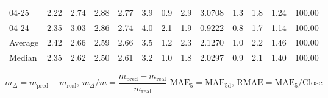 \begin{threeparttable}
{\begin{tabular}{lrrrrrrrrrrrr}
  04-25 &          2.22 &          2.74 &          2.88 &        2.77 &                 3.9 &                 0.9 &        2.9 &       3.0708 &                 1.3 &              1.8 &            1.24 &                 100.00 \\
  04-24 &          2.35 &          3.03 &          2.86 &        2.74 &                 4.0 &                 2.1 &        1.9 &       0.9222 &                 0.8 &              1.7 &            1.14 &                 100.00 \\
Average &          2.42 &          2.66 &          2.59 &        2.66 &                 3.5 &                 1.2 &        2.3 &       2.1270 &                 1.0 &              2.2 &            1.46 &                 100.00 \\
 Median &          2.35 &          2.62 &          2.50 &        2.61 &                 3.2 &                 1.0 &        1.8 &       2.0297 &                 0.9 &              2.1 &            1.40 &                 100.00 \\
\bottomrule
\end{tabular}
}
\begin{tablenotes}\footnotesize
\item $m_\Delta=m_{\text{pred}}-m_{\text{real}}$,
$m_\Delta/m=\dfrac{m_{\text{pred}}-m_{\text{real}}}{m_{\text{real}}}$
$\mathrm{MAE}_5=\mathrm{MAE}_{5\text{d}}$,
$\mathrm{RMAE}=\mathrm{MAE}_5/\text{Close}$
\end{tablenotes}
\end{threeparttable}
\endgroup

